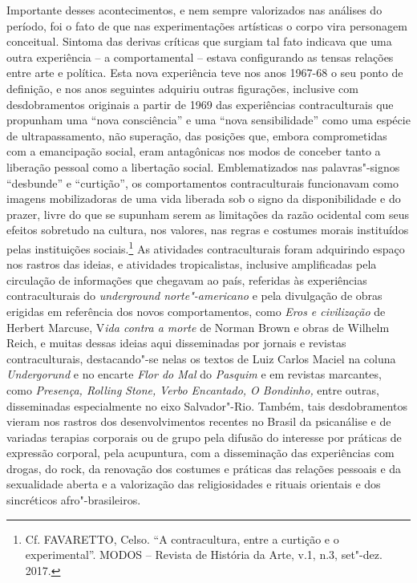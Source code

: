 Importante desses acontecimentos, e nem sempre valorizados nas análises
do período, foi o fato de que nas experimentações artísticas o corpo
vira personagem conceitual. Sintoma das derivas críticas que surgiam tal
fato indicava que uma outra experiência -- a comportamental -- estava
configurando as tensas relações entre arte e política. Esta nova
experiência teve nos anos 1967-68 o seu ponto de definição, e nos anos
seguintes adquiriu outras figurações, inclusive com desdobramentos
originais a partir de 1969 das experiências contraculturais que
propunham uma ``nova consciência'' e uma ``nova sensibilidade'' como uma
espécie de ultrapassamento, não superação, das posições que, embora
comprometidas com a emancipação social, eram antagônicas nos modos de
conceber tanto a liberação pessoal como a libertação social.
Emblematizados nas palavras"-signos ``desbunde'' e ``curtição'', os
comportamentos contraculturais funcionavam como imagens mobilizadoras de
uma vida liberada sob o signo da disponibilidade e do prazer, livre do
que se supunham serem as limitações da razão ocidental com seus efeitos
sobretudo na cultura, nos valores, nas regras e costumes morais
instituídos pelas instituições sociais.\footnote{Cf. \textsc{FAVARETTO}, Celso.
  ``A contracultura, entre a curtição e o experimental''. \textsc{MODOS} --
  Revista de História da Arte, v.1, n.3, set"-dez. 2017.} As atividades
contraculturais foram adquirindo espaço nos rastros das ideias, e
atividades tropicalistas, inclusive amplificadas pela circulação de
informações que chegavam ao país, referidas às experiências
contraculturais do \emph{underground norte"-americano} e pela divulgação
de obras erigidas em referência dos novos comportamentos, como
\emph{Eros e civilização} de Herbert Marcuse, V\emph{ida contra a morte}
de Norman Brown e obras de Wilhelm Reich, e muitas dessas ideias aqui
disseminadas por jornais e revistas contraculturais, destacando"-se nelas
os textos de Luiz Carlos Maciel na coluna \emph{Undergorund} e no
encarte \emph{Flor do Mal} do \emph{Pasquim} e em revistas marcantes,
como \emph{Presença, Rolling} \emph{Stone,} \emph{Verbo Encantado, O
Bondinho,} entre outras, disseminadas especialmente no eixo
Salvador"-Rio. Também, tais desdobramentos vieram nos rastros dos
desenvolvimentos recentes no Brasil da psicanálise e de variadas
terapias corporais ou de grupo pela difusão do interesse por
práticas de expressão corporal, pela acupuntura, com a disseminação das
experiências com drogas, do rock, da renovação dos costumes e práticas
das relações pessoais e da sexualidade aberta e a valorização das
religiosidades e rituais orientais e dos sincréticos afro"-brasileiros.

